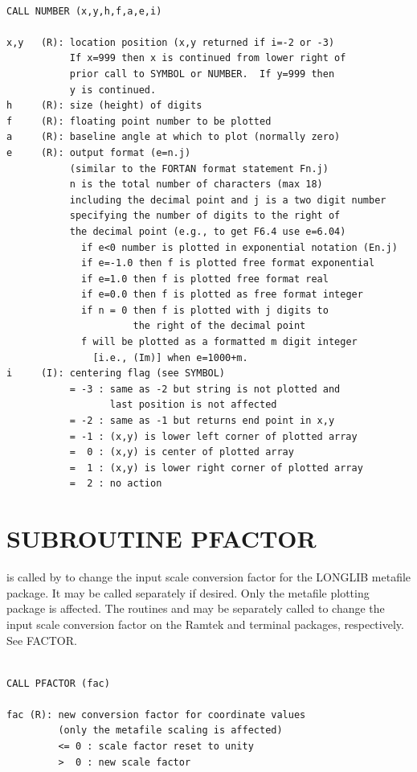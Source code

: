 \documentclass[11pt]{report}
\begin{document}
\begin{verbatim}

CALL NUMBER (x,y,h,f,a,e,i)

x,y   (R): location position (x,y returned if i=-2 or -3)
           If x=999 then x is continued from lower right of
           prior call to SYMBOL or NUMBER.  If y=999 then
           y is continued.
h     (R): size (height) of digits
f     (R): floating point number to be plotted
a     (R): baseline angle at which to plot (normally zero)
e     (R): output format (e=n.j) 
           (similar to the FORTAN format statement Fn.j)
           n is the total number of characters (max 18) 
           including the decimal point and j is a two digit number
           specifying the number of digits to the right of 
           the decimal point (e.g., to get F6.4 use e=6.04)
             if e<0 number is plotted in exponential notation (En.j)
             if e=-1.0 then f is plotted free format exponential
             if e=1.0 then f is plotted free format real
             if e=0.0 then f is plotted as free format integer
             if n = 0 then f is plotted with j digits to
                      the right of the decimal point
             f will be plotted as a formatted m digit integer
               [i.e., (Im)] when e=1000+m.
i     (I): centering flag (see SYMBOL)
           = -3 : same as -2 but string is not plotted and
                  last position is not affected
           = -2 : same as -1 but returns end point in x,y
           = -1 : (x,y) is lower left corner of plotted array
           =  0 : (x,y) is center of plotted array
           =  1 : (x,y) is lower right corner of plotted array
           =  2 : no action
\end{verbatim}

\section{SUBROUTINE PFACTOR}

 is called by  to change the input scale conversion factor
for the LONGLIB metafile package.  It may be called separately if desired.
Only the metafile plotting package
is affected.  The routines  and  may be separately 
called to change the input scale conversion factor on the Ramtek and
terminal packages, respectively.  See FACTOR.
\begin{verbatim}

CALL PFACTOR (fac)

fac (R): new conversion factor for coordinate values
         (only the metafile scaling is affected)
         <= 0 : scale factor reset to unity
         >  0 : new scale factor
\end{verbatim}
\end{document}
